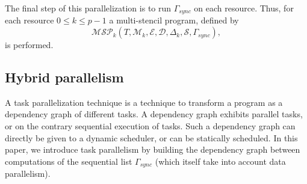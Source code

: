 



 The final step of this parallelization is to run $\Gamma_{sync}$ on each resource. Thus, for each resource $0 \leq k \leq p-1$ a multi-stencil program, defined by
\begin{equation}
\mathcal{MSP}_k(T,\mathcal{M}_k,\mathcal{E},\mathcal{D},\Delta_k, \mathcal{S},\Gamma_{sync}),
\end{equation}
is performed.


\subsection{Hybrid parallelism}
A task parallelization technique is a technique to transform a program as a dependency graph of different tasks. A dependency graph exhibits parallel tasks, or on the contrary sequential execution of tasks. Such a dependency graph can directly be given to a dynamic scheduler, or can be statically scheduled. In this paper, we introduce task parallelism by building the dependency graph between computations of the sequential list $\Gamma_{sync}$ (which itself take into account data parallelism).

